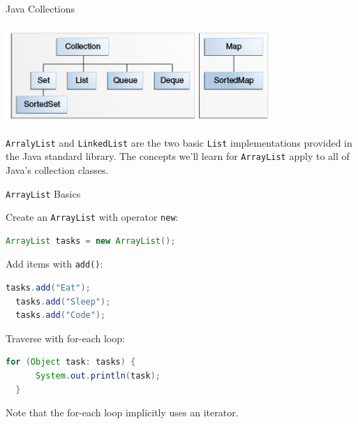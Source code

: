 \documentclass{beamer}
\author[Chris Simpkins] 
{Christopher Simpkins \\\texttt{chris.simpkins@gatech.edu}}
\institute[Georgia Tech] %
\date[CS 1331]{}
\begin{document}
\begin{frame}
  \titlepage
\end{frame}


\begin{frame}[fragile]{Java Collections}

\begin{center}
\includegraphics[width=4in]{colls-coreInterfaces.png}
\end{center}

{\tt ArralyList} and {\tt LinkedList} are the two basic {\tt List} implementations provided in the Java standard library.  The concepts we'll learn for {\tt ArrayList} apply to all of Java's collection classes.

\end{frame}

\begin{frame}[fragile]{{\tt ArrayList} Basics}


Create an {\tt ArrayList} with operator {\tt new}:
\begin{lstlisting}[language=Java]
  ArrayList tasks = new ArrayList();
\end{lstlisting}
Add items with {\tt add()}:
\begin{lstlisting}[language=Java]
  tasks.add("Eat");
  tasks.add("Sleep");
  tasks.add("Code");
\end{lstlisting}
Traverse with for-each loop:
\begin{lstlisting}[language=Java]
  for (Object task: tasks) {
      System.out.println(task);
  }
\end{lstlisting}

Note that the for-each loop implicitly uses an iterator.

\end{frame}
\end{document}
